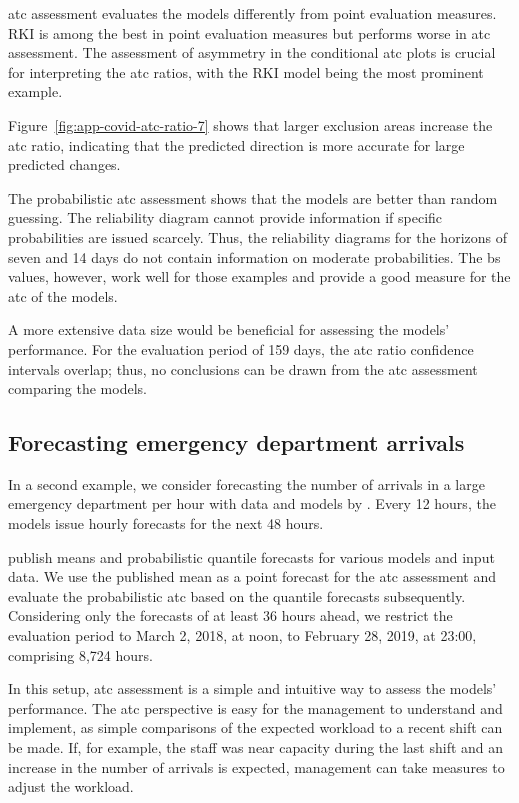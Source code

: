 \documentclass[pdflatex]{sn-jnl}
\theoremstyle{plain}%
\theoremstyle{definition}
\begin{document}
\ac{atc} assessment evaluates the models differently from point evaluation measures.
RKI is among the best in point evaluation measures but performs worse in \ac{atc} assessment.
The assessment of asymmetry in the conditional \ac{atc} plots is crucial for interpreting the \ac{atc} ratios, with the RKI model being the most prominent example.

Figure~\ref{fig:app-covid-atc-ratio-7} shows that larger exclusion areas increase the \ac{atc} ratio, indicating that the predicted direction is more accurate for large predicted changes.

The probabilistic \ac{atc} assessment shows that the models are better than random guessing.
The reliability diagram cannot provide information if specific probabilities are issued scarcely.
Thus, the reliability diagrams for the horizons of seven and 14 days do not contain information on moderate probabilities.
The \ac{bs} values, however, work well for those examples and provide a good measure for the \ac{atc} of the models.

A more extensive data size would be beneficial for assessing the models' performance.
For the evaluation period of 159 days, the \ac{atc} ratio confidence intervals overlap; thus, no conclusions can be drawn from the \ac{atc} assessment comparing the models.

\subsection{Forecasting emergency department arrivals}\label{sec:application-eda}

In a second example, we consider forecasting the number of arrivals in a large emergency department per hour with data and models by \citet{Rostami-Tabar2023}.
Every 12 hours, the models issue hourly forecasts for the next 48 hours.

\citet{Rostami-Tabar2023} publish means and probabilistic quantile forecasts for various models and input data.
We use the published mean as a point forecast for the \ac{atc} assessment and evaluate the probabilistic \ac{atc} based on the quantile forecasts subsequently.
Considering only the forecasts of at least 36 hours ahead, we restrict the evaluation period to March 2, 2018, at noon, to February 28, 2019, at 23:00, comprising 8,724 hours.

In this setup, \ac{atc} assessment is a simple and intuitive way to assess the models' performance.
The \ac{atc} perspective is easy for the management to understand and implement, as simple comparisons of the expected workload to a recent shift can be made.
If, for example, the staff was near capacity during the last shift and an increase in the number of arrivals is expected, management can take measures to adjust the workload.
\end{document}
